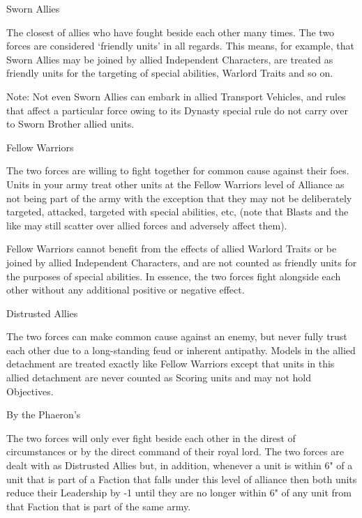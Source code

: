 \noindent
\yellowskull Sworn Allies

The closest of allies who have fought beside each other many times. The two forces are considered ‘friendly units’ in all regards. This means, for example, that Sworn Allies may be joined by allied Independent Characters, are treated as friendly units for the targeting of special abilities, Warlord Traits and so on.

Note: Not even Sworn Allies can embark in allied Transport Vehicles, and rules that affect a particular force owing to its Dynasty special rule do not carry over to Sworn Brother allied units.

\noindent
\blackskull Fellow Warriors

The two forces are willing to fight together for common cause against their foes. Units in your army treat other units at the Fellow Warriors level of Alliance as not being part of the army with the exception that they may not be deliberately targeted, attacked, targeted with special abilities, etc, (note that Blasts and the like may still scatter over allied forces and adversely affect them).

Fellow Warriors cannot benefit from the effects of allied Warlord Traits or be joined by allied Independent Characters, and are not counted as friendly units for the purposes of special abilities. In essence, the two forces fight alongside each other without any additional positive or negative effect.

\noindent
\greyskull Distrusted Allies

The two forces can make common cause against an enemy, but never fully trust each other due to a long-standing feud or inherent antipathy. Models in the allied detachment are treated exactly like Fellow Warriors except that units in this allied detachment are never counted as Scoring units and may not hold Objectives.

\noindent
\redskull By the Phaeron's

The two forces will only ever fight beside each other in the direst of circumstances or by the direct command of their royal lord. The two forces are dealt with as Distrusted Allies but, in addition, whenever a unit is within 6" of a unit that is part of a Faction that falls under this level of alliance then both units reduce their Leadership by -1 until they are no longer within 6" of any unit from that Faction that is part of the same army.


\newpage
{}

